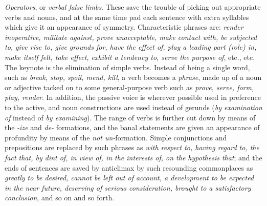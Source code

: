 \textit{Operators}, or \textit{verbal false limbs}. These save the
trouble of picking out appropriate verbs and nouns, and at the same
time pad each sentence with extra syllables which give it an
appearance of symmetry. Characteristic phrases are: \textit{render
inoperative, militate against, prove unacceptable, make contact with,
be subjected to, give  rise to, give grounds for, have the
effect of, play a leading part (role) in, make itself felt, take
effect, exhibit a tendency to, serve the purpose of}, etc., etc. The
keynote is the elimination of simple verbs. Instead of being a
single word, such as \textit{break, stop, spoil, mend, kill}, a verb
becomes a \textit{phrase}, made up of a noun or adjective tacked on to
some general-purpose verb such as \textit{prove, serve, form, play,
render}. In addition, the passive voice is wherever possible used in
preference to the active, and noun constructions are used instead of
gerunds (\textit{by examination of} instead of \textit{by examining}).
The range of verbs is further cut down by means of the \textit{-ize}
and \textit{de-} formations, and the banal statements are given an
appearance of profundity by means of the \textit{not un-}formation.
Simple conjunctions and prepositions are replaced by such phrases as
\textit{with respect to, having regard to, the fact that, by dint of,
in view of, in the interests of, on the hypothesis that}; and the ends
of sentences are saved by anticlimax by such resounding commonplaces
as \textit{greatly to be desired, cannot be left out of account, a
development to be expected in the near future, deserving of serious
consideration, brought to a satisfactory conclusion}, and so on and
so forth.

\vspace{1\baselineskip}


